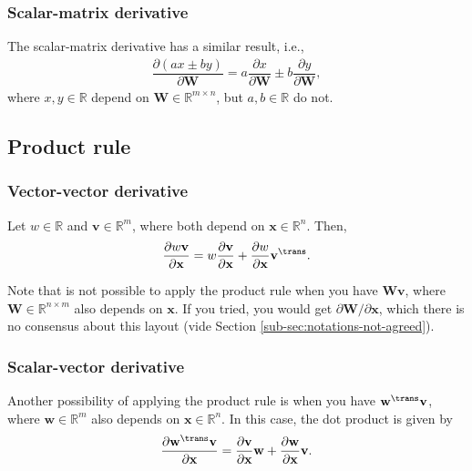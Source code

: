 \subsubsection{Scalar-matrix derivative}
The scalar-matrix derivative has a similar result, i.e.,
\begin{align}
    \dfrac{\partial \left( ax \pm by \right)}{\partial \mathbf{W}} = a\dfrac{\partial x}{\partial \mathbf{W}} \pm b \dfrac{\partial y}{\partial \mathbf{W}},
\end{align}
where \(x, y \in \mathbb{R}\) depend on \(\mathbf{W} \in \mathbb{R}^{m\times n}\), but \(a,b \in \mathbb{R}\) do not.

\subsection{Product rule}
\subsubsection{Vector-vector derivative}
Let \(w \in \mathbb{R}\) and \(\mathbf{v} \in \mathbb{R}^{m}\), where both depend on \(\mathbf{x} \in \mathbb{R}^{n}\). Then,
\begin{align}
    \dfrac{\partial w \mathbf{v}}{\partial \mathbf{x}} = w \dfrac{\partial \mathbf{v}}{\partial \mathbf{x}} + \dfrac{\partial w}{\partial \mathbf{x}} \mathbf{v}^\trans.
\end{align}

Note that is not possible to apply the product rule when you have \(\mathbf{Wv}\), where \(\mathbf{W} \in \mathbb{R}^{n \times m}\) also depends on \(\mathbf{x}\). If you tried, you would get \(\partial\mathbf{W}/\partial\mathbf{x}\), which there is no consensus about this layout (vide Section \ref{sub-sec:notations-not-agreed}).
\subsubsection{Scalar-vector derivative}
Another possibility of applying the product rule is when you have \(\mathbf{w}^{\trans} \mathbf{v}\), where \(\mathbf{w} \in \mathbb{R}^{m}\) also depends on \(\mathbf{x} \in \mathbb{R}^{n}\). In this case, the dot product is given by
\begin{align}
    \label{eq:scalar-vector-product-rule}
    \dfrac{\partial \mathbf{w}^{\trans} \mathbf{v}}{\partial \mathbf{x}} = \dfrac{\partial \mathbf{v}}{\partial \mathbf{x}} \mathbf{w} + \dfrac{\partial \mathbf{w}}{\partial \mathbf{x}} \mathbf{v}.
\end{align}

